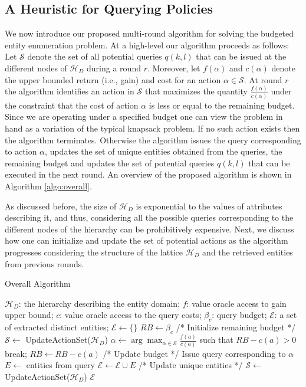 \documentclass{vldb}
\newcommand{\hierarchy}{\mathcal{H}_D}
\newcommand{\uentities}{\mathcal{E}}
\begin{document}
\subsection{A Heuristic for Querying Policies}
\label{sec:heuristic}
We now introduce our proposed multi-round algorithm for solving the budgeted entity enumeration problem. At a high-level our algorithm proceeds as follows: Let $\mathcal{S}$ denote the set of all potential queries $q(k,l)$ that can be issued at the different nodes of $\hierarchy$ during a round $r$. Moreover, let $f(\alpha)$ and $c(\alpha)$ denote the upper bounded return (i.e., gain) and cost for an action $\alpha \in \mathcal{S}$. At round $r$ the algorithm identifies an action in $\mathcal{S}$ that maximizes the quantity $\frac{f(\alpha)}{c(\alpha)}$ under the constraint that the cost of action $\alpha$ is less or equal to the remaining budget. Since we are operating under a specified budget one can view the problem in hand as a variation of the typical knapsack problem. If no such action exists then the algorithm terminates. Otherwise the algorithm issues the query corresponding to action $\alpha$, updates the set of unique entities obtained from the queries, the remaining budget and updates the set of potential queries $q(k,l)$ that can be executed in the next round.  An overview of the proposed algorithm is shown in Algorithm \ref{algo:overall}. 

As discussed before, the size of $\hierarchy$ is exponential to the values of attributes describing it, and thus, considering all the possible queries corresponding to the different nodes of the hierarchy can be prohibitively expensive. Next, we discuss how one can initialize and update the set of potential actions as the algorithm progresses considering the structure of the lattice $\hierarchy$ and the retrieved entities from previous rounds. 

\begin{algorithm}[h]
\caption{Overall Algorithm}
\label{algo:overall}
\begin{algorithmic}[1]
 $\hierarchy$: the hierarchy describing the entity domain; $f$: value oracle access to gain upper bound; $c$: value oracle access to the query costs; $\beta_c$: query budget;
 $\uentities$: a set of extracted distinct entities;
\STATE $\uentities \leftarrow \{\}$
\STATE $RB \leftarrow \beta_c$ /* Initialize remaining budget */
\STATE $\mathcal{S} \leftarrow$ {\sf UpdateActionSet($\hierarchy$)}
	\STATE $\alpha \leftarrow \arg\max_{\alpha \in {\mathcal{S}}} \frac{f(a)}{c(a)}$ such that $RB - c(a) >0$
		\STATE break;
	\ENDIF
	\STATE $RB \leftarrow RB - c(a)$ /* Update budget */
	\STATE Issue query corresponding to $\alpha$
	\STATE $E \leftarrow$ entities from query
	\STATE $\uentities \leftarrow \uentities \cup E$ /* Update unique entities */
	\STATE $\mathcal{S} \leftarrow$ {\sf UpdateActionSet($\hierarchy$)}
\ENDWHILE
\RETURN $\uentities$
\end{algorithmic}
\end{algorithm}
\end{document}
